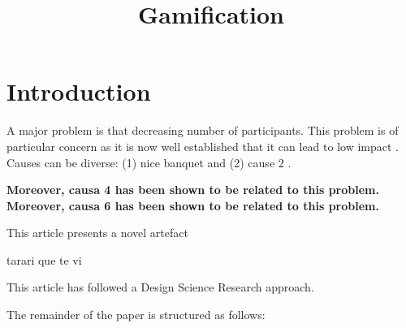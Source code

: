 \documentclass{article}
\title{Gamification}
\author{}
\newcommand{\todo}[1] {\iffalse #1 \fi} %
\begin{document}
\maketitle
      

\section{Introduction}


    
A major problem is that decreasing number of participants. This problem is of particular concern as it is now well established that it can lead to low impact \cite{Hamari2014} \cite{Hamari2014} \cite{Hamari2014} \cite{Hamari2014}. Causes can be diverse: (1) nice banquet \cite{Hamari2014} and (2) cause 2 \cite{Liu2017}.
\todo{que no se nos olvide considerar las causa 5}
    
\textbf{ Moreover, causa 4 has been shown to be related to this problem.\textbf{ Moreover, causa 6 has been shown to be related to this problem. } }%

    

    
This article presents a novel artefact
    
tarari que te vi \todo{poner bibliografia}

    

      
This article has followed a Design Science Research approach.

The remainder of the paper is structured as follows: 

    
      


\end{document}
